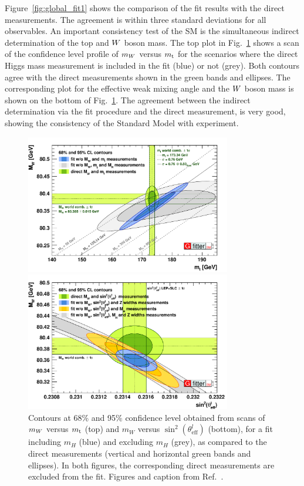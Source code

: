 Figure~\ref{fig:global_fit1} shows the comparison of the fit results with the direct measurements.
The agreement is within three standard deviations for all observables. 
An important consistency test of the SM is the simultaneous indirect determination of
the top and $W$ boson mass. The top plot in Fig.~\ref{fig:global_fit} shows a scan of the
confidence level profile of $m_{W}$ versus $m_{\mathrm{t}}$ for the scenarios where the direct Higgs mass
measurement is included in the fit (blue) or not (grey). Both contours agree with the direct
measurements shown in the green bands and ellipses. The corresponding plot for the effective weak
mixing angle and the $W$ boson mass is shown on the bottom of Fig.~\ref{fig:global_fit}. 
The agreement between the indirect determination via the fit procedure and the direct measurement,
is very good, showing the consistency of the Standard Model with experiment. 


\begin{figure}[p]
  \centering
  \includegraphics[width=0.8\textwidth]{figures/standardmodel/2014_07_16_Scan2D_MWvsmt_logo}
  
  \vspace{1eM}
  
  \includegraphics[width=0.8\textwidth]{figures/standardmodel/2014_07_16_Scan2D_MWvsSinEffLep_logo}
\caption{Contours at 68\% and 95\% confidence level obtained from scans of $m_{W}$ versus $m_{\mathrm{t}}$
(top) and $m_W$ versus $\sin^2 (\theta^l_{\text{eff}})$ (bottom), for a fit including $m_H$ (blue)
and excluding $m_H$ (grey), as compared to the direct measurements (vertical and horizontal green
bands and ellipses). In both figures, the corresponding direct measurements are excluded
from the fit. Figures and caption from Ref.~\cite{Baak:2014ora}.
\label{fig:global_fit}}
\end{figure}


